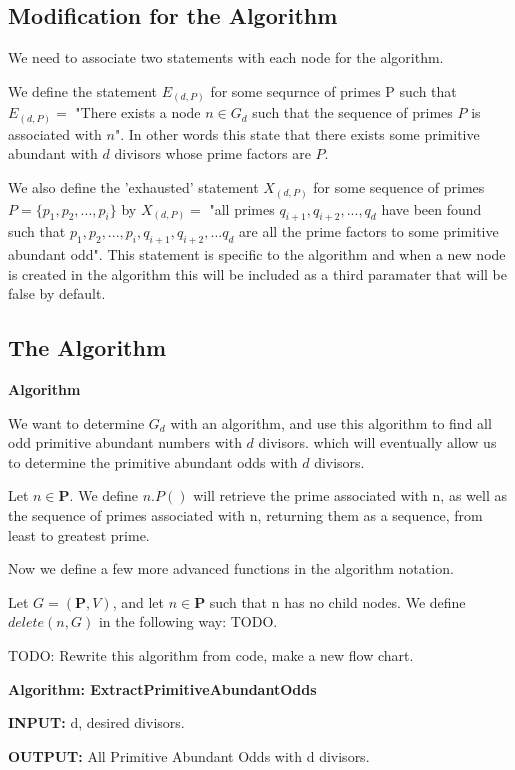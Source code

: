 \documentclass[../paper.tex]{subfiles}
\begin{document}
\subsection{Modification for the Algorithm}

We need to associate two statements with each node for the 
algorithm.

We define the statement $E_{(d,P)}$ for some sequrnce of primes P such 
that $E_{(d,P)} = $ "There exists a node $n \in G_d$ such that the
sequence 
of primes $P$ is associated with $n$". In other words this state that 
there exists some primitive abundant with $d$ divisors whose prime
factors are $P$.

We also define the 'exhausted' statement $X_{(d,P)}$ for some
sequence of 
primes $P = \{p_1, p_2, ..., p_i\}$   by $X_{(d,P)} = $ "all primes 
$q_{i+1}, q_{i+2}, ..., q_d$ have been found such that $p_1,p_2, 
..., p_i, q_{i+1}, q_{i+2}, ...q_d$ are all the prime factors to some
primitive abundant odd". This statement is specific to the algorithm 
and when a new node is created in the algorithm this will be included
as a third paramater that will be false by default. 


\subsection{The Algorithm}
\textbf{Algorithm} 

We want to determine $G_d$ with an algorithm, and use this
algorithm to find all odd primitive abundant numbers with $d$
divisors.  
which will eventually allow us to determine the primitive abundant 
odds with $d$ divisors.

Let $n \in \mathbf{P}$.
%
We define $n.P()$ will retrieve the prime associated with n, as
well as the sequence of primes associated with n, returning them as a 
sequence, from least to greatest prime.

\noindent
Now we define a few more advanced functions in the algorithm 
notation.


Let $G = (\mathbf{P}, V)$, and
let $n \in \mathbf{P}$ such that n has no child nodes. 
%
We define $delete(n, G)$ in the following way: TODO. 

\begin {algorithmic}
\STATE TODO: Rewrite this algorithm from code, make a new flow
chart.

\end {algorithmic}

{\setlength{\parindent}{0cm}

\textbf{Algorithm: ExtractPrimitiveAbundantOdds}

\textbf{INPUT:} d, desired divisors.

\textbf{OUTPUT:} All Primitive Abundant Odds with d divisors.

}
\end{document}
